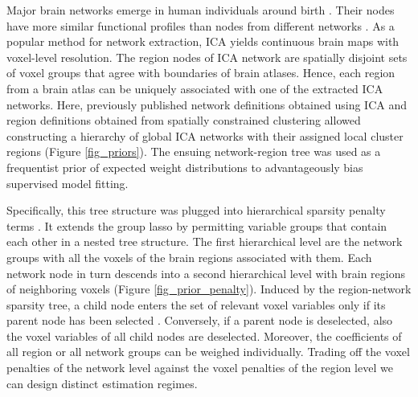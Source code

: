 \documentclass[runningheads,a4paper]{llncs}
\begin{document}
Major brain networks emerge in human individuals around birth
\cite{doria2010}.
Their nodes have more
similar functional profiles than nodes from different networks
\cite{anderson2013}.
As a popular method for network extraction,
ICA \cite{beckmann2005} yields continuous brain maps with
voxel-level resolution. The region nodes of ICA
network are spatially disjoint sets of voxel groups that
agree with boundaries of brain atlases.
Hence,
each region from a brain atlas can be uniquely associated with one of
the extracted ICA networks.
%
Here, previously published network definitions
obtained using ICA \cite{smith2009}
and
region definitions obtained from
spatially constrained clustering \cite{crad12}
allowed constructing a hierarchy of global ICA networks with their
assigned local cluster regions
(Figure \ref{fig_priors}).
The ensuing network-region tree was used as a frequentist prior
of expected weight distributions
to advantageously bias supervised model fitting.

Specifically, this tree structure was plugged into
hierarchical sparsity penalty terms
\cite{jenatton2012multi}.
It extends the group lasso
\cite{yuan2006model}
by permitting variable groups that contain each other
in a nested tree structure.
The first hierarchical level are
the network groups with all
the voxels of the brain regions associated with them.
Each network node in turn descends into a second hierarchical level with
brain regions of neighboring voxels
(Figure \ref{fig_prior_penalty}).
%
Induced by the region-network sparsity tree,
a child node enters the set of relevant voxel variables only
if its parent node has been selected
\cite{bach2012optimization}.
Conversely,
if a parent node is deselected,
also the voxel variables of all child nodes are deselected.
%
Moreover,
the coefficients of all region or all network groups can
be weighed individually.
Trading off the voxel penalties of the network level against the
voxel penalties of the region level
we can design distinct estimation regimes.
%
%
\end{document}
